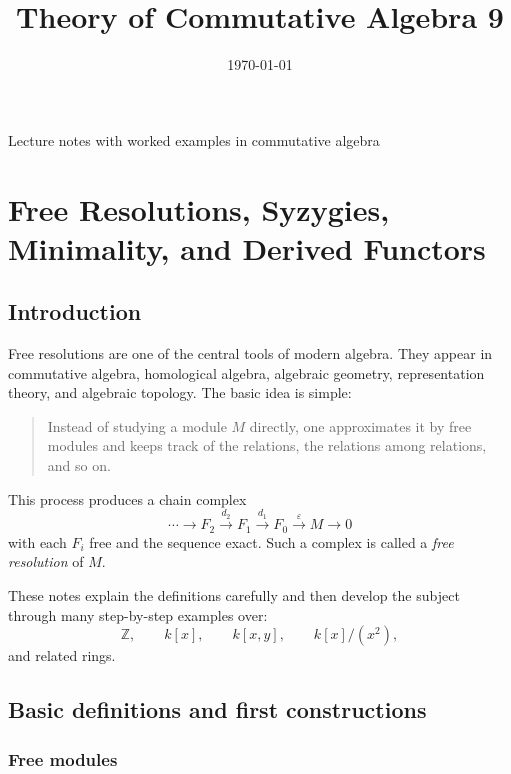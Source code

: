 \documentclass[12pt,a4paper]{article}
\title{\vspace{-1.5em}\bfseries Theory of Commutative Algebra 9}
\author{}
\date{\today}
\theoremstyle{notespace}
\newcommand{\ZZ}{\mathbb{Z}}
\begin{document}
	\maketitle
	\thispagestyle{plain}
		\begin{center}
		\begin{minipage}{0.92\textwidth}
			Lecture notes with worked examples in commutative algebra
		\end{minipage}
	\end{center}
		\tableofcontents
	\clearpage


\section{Free Resolutions, Syzygies, Minimality, and Derived Functors}

\subsection{Introduction}

Free resolutions are one of the central tools of modern algebra. They appear in commutative algebra, homological algebra, algebraic geometry, representation theory, and algebraic topology. The basic idea is simple:

\begin{quote}
	Instead of studying a module \(M\) directly, one approximates it by free modules and keeps track of the relations, the relations among relations, and so on.
\end{quote}

This process produces a chain complex
\[
\cdots \longrightarrow F_2 \xrightarrow{d_2} F_1 \xrightarrow{d_1} F_0 \xrightarrow{\varepsilon} M \longrightarrow 0
\]
with each \(F_i\) free and the sequence exact. Such a complex is called a \emph{free resolution} of \(M\).

These notes explain the definitions carefully and then develop the subject through many step-by-step examples over:
\[
\ZZ,\qquad k[x],\qquad k[x,y],\qquad k[x]/(x^2),
\]
and related rings.

\subsection{Basic definitions and first constructions}

\subsubsection{Free modules}
\end{document}
